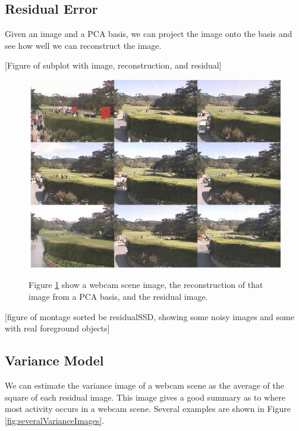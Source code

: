 \subsection{Residual Error}

Given an image and a PCA basis, we can project the image onto the basis and see how well we can reconstruct the image.

[Figure of subplot with image, reconstruction, and residual]

\begin{figure}
	\centering
		\includegraphics[width=1\textwidth]{figures/residualSSDmontage.jpg}
	\label{fig:residualSSDmontage}
	
		\caption[Residual SSD Montage.]{Figure \ref{fig:residualSSDmontage} show a webcam scene image, the reconstruction of that image from a PCA basis, and the residual image.}
\end{figure}

[figure of montage sorted be residualSSD, showing some noisy images and some with real foreground objects]


\subsection{Variance Model}

We can estimate the variance image of a webcam scene as the average of the square of each residual image.  This image gives a good summary as to where most activity occurs in a webcam scene.  Several examples are shown in Figure \ref{fig:severalVarianceImages}.

